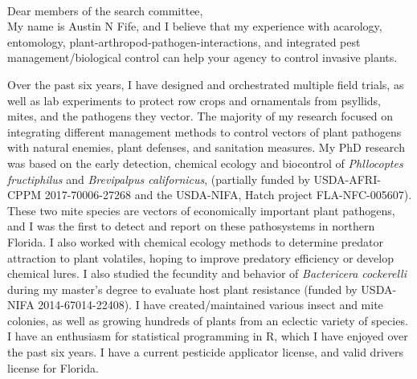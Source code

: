 \documentclass[11pt]{letter} %
\begin{document}
	\begin{letter}
		\\
		Dear members of the search committee,\\
		
		My name is Austin N Fife, and I believe that my experience with acarology, entomology, plant-arthropod-pathogen-interactions, and integrated pest management/biological control can help your agency to control invasive plants.
		
		Over the past six years, I have designed and orchestrated multiple field trials, as well as lab experiments to protect row crops and ornamentals from psyllids, mites, and the pathogens they vector. The majority of my research focused on integrating different management methods to control vectors of plant pathogens with natural enemies, plant defenses, and sanitation measures. My PhD research was based on the early detection, chemical ecology and biocontrol of \textit{Phllocoptes fructiphilus} and \textit{Brevipalpus californicus}, (partially funded by USDA-AFRI-CPPM 2017-70006-27268 and the USDA-NIFA, Hatch project FLA-NFC-005607). These two mite species are vectors of economically important plant pathogens, and I was the first to detect and report on these pathosystems in northern Florida. I also worked with chemical ecology methods to determine predator attraction to plant volatiles, hoping to improve predatory efficiency or develop chemical lures. I also studied the fecundity and behavior of \textit{Bactericera cockerelli} during my master's degree to evaluate host plant resistance (funded by USDA-NIFA 2014-67014-22408). I have created/maintained various insect and mite colonies, as well as growing hundreds of plants from an eclectic variety of species. I have an enthusiasm for statistical programming in R, which I have enjoyed over the past six years. I have a current pesticide applicator license, and valid drivers license for Florida.
		

\end{letter}
\end{document}
